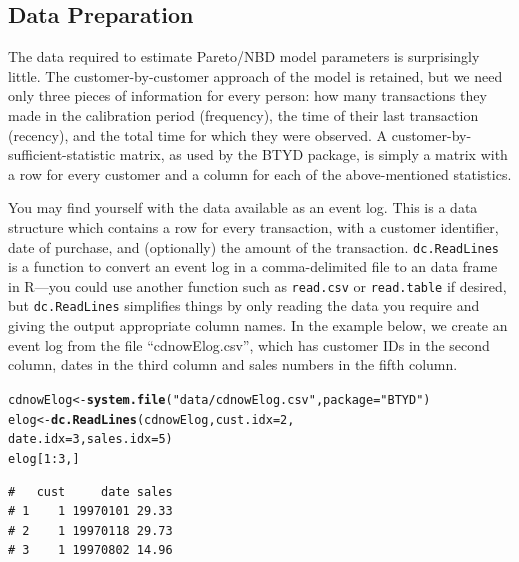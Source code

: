 \documentclass[10pt, letterpaper, onecolumn, oneside, final]{article}\usepackage[]{graphicx}\usepackage[]{color}
\makeatletter
\newcommand{\hlnum}[1]{\textcolor[rgb]{0.686,0.059,0.569}{#1}}%
\newcommand{\hlstr}[1]{\textcolor[rgb]{0.192,0.494,0.8}{#1}}%
\newcommand{\hlopt}[1]{\textcolor[rgb]{0,0,0}{#1}}%
\newcommand{\hlstd}[1]{\textcolor[rgb]{0.345,0.345,0.345}{#1}}%
\newcommand{\hlkwb}[1]{\textcolor[rgb]{0.69,0.353,0.396}{#1}}%
\newcommand{\hlkwc}[1]{\textcolor[rgb]{0.333,0.667,0.333}{#1}}%
\newcommand{\hlkwd}[1]{\textcolor[rgb]{0.737,0.353,0.396}{\textbf{#1}}}%
\newenvironment{kframe}{%
 \def\at@end@of@kframe{}%
 \ifinner\ifhmode%
  \def\at@end@of@kframe{\end{minipage}}%
  \begin{minipage}{\columnwidth}%
 \fi\fi%
 \def\FrameCommand##1{\hskip\@totalleftmargin \hskip-\fboxsep
 \colorbox{shadecolor}{##1}\hskip-\fboxsep
     \hskip-\linewidth \hskip-\@totalleftmargin \hskip\columnwidth}%
 \MakeFramed {\advance\hsize-\width
   \@totalleftmargin\z@ \linewidth\hsize
   \@setminipage}}%
 {\par\unskip\endMakeFramed%
 \at@end@of@kframe}
\newenvironment{knitrout}{}{} %
\makeatother
\begin{document}
\subsection{Data Preparation}

The data required to estimate Pareto/NBD model parameters is
surprisingly little. The customer-by-customer approach of the model is
retained, but we need only three pieces of information for every
person: how many transactions they made in the calibration period
(frequency), the time of their last transaction (recency), and the
total time for which they were observed. A
customer-by-sufficient-statistic matrix, as used by the BTYD package,
is simply a matrix with a row for every customer and a column for each
of the above-mentioned statistics.

You may find yourself with the data available as an event log. This is
a data structure which contains a row for every transaction, with a
customer identifier, date of purchase, and (optionally) the amount of
the transaction. \texttt{dc.ReadLines} is a function to convert an
event log in a comma-delimited file to an data frame in R---you could
use another function such as \texttt{read.csv} or \texttt{read.table}
if desired, but \texttt{dc.ReadLines} simplifies things by only
reading the data you require and giving the output appropriate column
names. In the example below, we create an event log from the file
``cdnowElog.csv'', which has customer IDs in the second column, dates
in the third column and sales numbers in the fifth column.

\begin{knitrout}
\color{fgcolor}\begin{kframe}
\begin{alltt}
\hlstd{cdnowElog} \hlkwb{<-} \hlkwd{system.file}\hlstd{(}\hlstr{"data/cdnowElog.csv"}\hlstd{,} \hlkwc{package} \hlstd{=} \hlstr{"BTYD"}\hlstd{)}
\hlstd{elog} \hlkwb{<-} \hlkwd{dc.ReadLines}\hlstd{(cdnowElog,} \hlkwc{cust.idx} \hlstd{=} \hlnum{2}\hlstd{,}
                     \hlkwc{date.idx} \hlstd{=} \hlnum{3}\hlstd{,} \hlkwc{sales.idx} \hlstd{=} \hlnum{5}\hlstd{)}
\hlstd{elog[}\hlnum{1}\hlopt{:}\hlnum{3}\hlstd{,]}
\end{alltt}
\begin{verbatim}
#   cust     date sales
# 1    1 19970101 29.33
# 2    1 19970118 29.73
# 3    1 19970802 14.96
\end{verbatim}
\end{kframe}
\end{knitrout}
\end{document}
